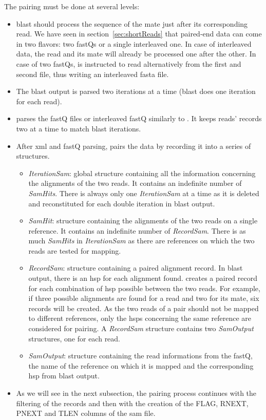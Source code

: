 The pairing must be done at several levels:
\begin{itemize}
    \item \gls{blast} should process the sequence of the mate just after its corresponding read.
    We have seen in section~\ref{sec:shortReads} that paired-end data can come in two flavors: two fastQs or a single interleaved one.
    In case of interleaved data, the read and its mate will already be processed one after the other.
    In case of two fastQs, \fastqtofasta{} is instructed to read alternatively from the first and second file, thus writing an interleaved fasta file.
    \item The \gls{blast} output is parsed two iterations at a time (\gls{blast} does one iteration for each read).
    \item \blastobam{} parses the fastQ files or interleaved fastQ similarly to \fastqtofasta{}.
    It keeps reads' records two at a time to match \gls{blast} iterations.
    \item After \gls{xml} and fastQ parsing, \blastobam{} pairs the data by recording it into a series of structures.
    \begin{itemize}
        \item \emph{IterationSam}: global structure containing all the information concerning the alignments of the two reads. It contains an indefinite number of \emph{SamHits}.
        There is always only one \emph{IterationSam} at a time as it is deleted and reconstituted for each double iteration in \gls{blast} output.
        \item \emph{SamHit}: structure containing the alignments of the two reads on a single reference. It contains an indefinite number of \emph{RecordSam}.
        There is as much \emph{SamHits} in \emph{IterationSam} as there are references on which the two reads are tested for mapping.
        \item \emph{RecordSam}: structure containing a paired alignment record. In \gls{blast} output, there is an \gls{hsp} for each alignment found.
        \blastobam{} creates a paired record for each combination of \gls{hsp} possible between the two reads.
        For example, if three possible alignments are found for a read and two for its mate, six records will be created.
        As the two reads of a pair should not be mapped to different references, only the \glspl{hsp} concerning the same reference are considered for pairing.
        A \emph{RecordSam} structure contains two \emph{SamOutput} structures, one for each read.
        \item \emph{SamOutput}: structure containing the read informations from the fastQ, the name of the reference on which it is mapped and the corresponding \gls{hsp} from \gls{blast} output.
    \end{itemize}
    \item As we will see in the next subsection, the pairing process continues with the filtering of the records and then with the creation of the FLAG, RNEXT, PNEXT and TLEN columns of the \gls{sam} file.
\end{itemize}


